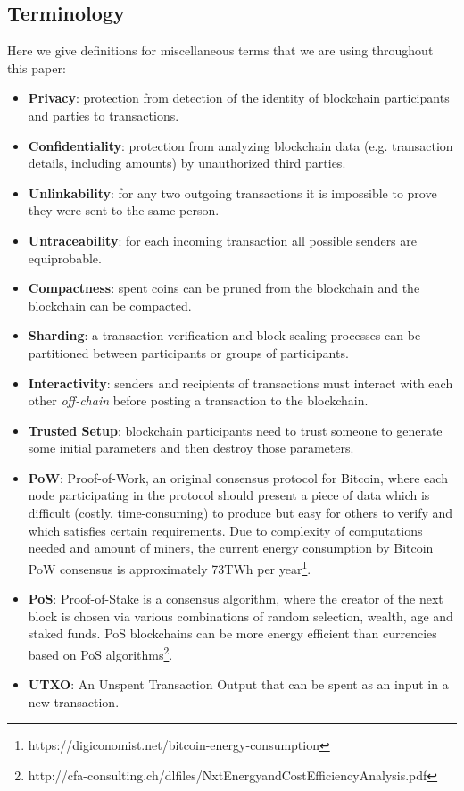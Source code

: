 \documentclass[a4paper, 10pt, conference]{ieeeconf}
\begin{document}
\subsection{Terminology}
Here we give definitions for miscellaneous terms that we are using throughout this paper:

\begin{itemize}
	\item \textbf{Privacy}: protection from detection of the identity of blockchain participants and parties to transactions.
	\item \textbf{Confidentiality}: protection from analyzing blockchain data (e.g. transaction details, including amounts) by unauthorized third parties.
	\item \textbf{Unlinkability}: for any two outgoing transactions it is impossible to prove they were sent to the same person\cite{c2}.
	\item \textbf{Untraceability}: for each incoming transaction all possible senders are equiprobable\cite{c2}.
	\item \textbf{Compactness}: spent coins can be pruned from the blockchain and the blockchain can be compacted.
	\item \textbf{Sharding}: a transaction verification and block sealing processes can be partitioned between participants or groups of participants.
	\item \textbf{Interactivity}: senders and recipients of transactions must interact with each other \textit{off-chain} before posting a transaction to the blockchain.
	\item \textbf{Trusted Setup}: blockchain participants need to trust someone to generate some initial parameters and then destroy those parameters.
	\item \textbf{PoW}: Proof-of-Work, an original consensus protocol for Bitcoin, where each node participating in the protocol should present a piece of data which is difficult (costly, time-consuming) to produce but easy for others to verify and which satisfies certain requirements. Due to complexity of computations needed and amount of miners, the current energy consumption by Bitcoin PoW consensus is approximately 73TWh per year\footnote{https://digiconomist.net/bitcoin-energy-consumption}.
	\item \textbf{PoS}: Proof-of-Stake is a consensus algorithm, where the creator of the next block is chosen via various combinations of random selection, wealth, age and staked funds. PoS blockchains can be more energy efficient than currencies based on PoS algorithms\footnote{http://cfa-consulting.ch/dlfiles/NxtEnergyandCostEfficiencyAnalysis.pdf}.
	\item \textbf{UTXO}: An Unspent Transaction Output that can be spent as an input in a new transaction.
\end{itemize}
\end{document}
